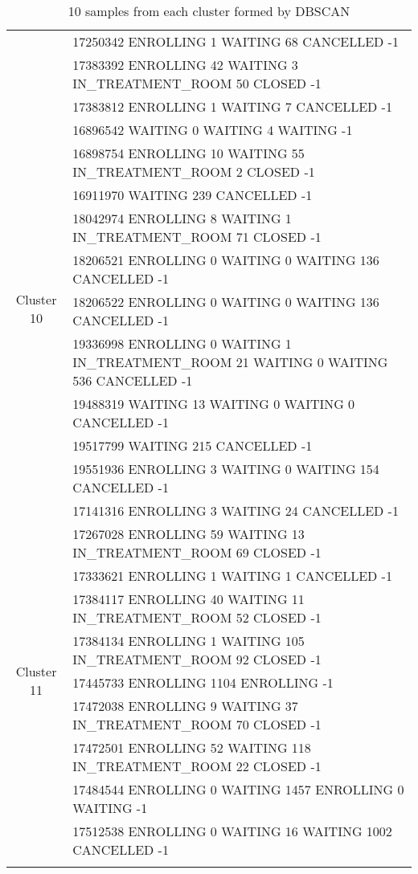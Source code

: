 {\begin{longtable}{|c|p{}|}
		& 17250342 ENROLLING 1 WAITING 68 CANCELLED -1 \\
		& 17383392 ENROLLING 42 WAITING 3 IN\_TREATMENT\_ROOM 50 CLOSED -1 \\
		& 17383812 ENROLLING 1 WAITING 7 CANCELLED -1 \\
		\hline
		\multirow{10}{*}{Cluster 10}
		& 16896542 WAITING 0 WAITING 4 WAITING -1 \\
		& 16898754 ENROLLING 10 WAITING 55 IN\_TREATMENT\_ROOM 2 CLOSED -1 \\
		& 16911970 WAITING 239 CANCELLED -1 \\
		& 18042974 ENROLLING 8 WAITING 1 IN\_TREATMENT\_ROOM 71 CLOSED -1 \\
		& 18206521 ENROLLING 0 WAITING 0 WAITING 136 CANCELLED -1 \\
		& 18206522 ENROLLING 0 WAITING 0 WAITING 136 CANCELLED -1 \\
		& 19336998 ENROLLING 0 WAITING 1 IN\_TREATMENT\_ROOM 21 WAITING 0 WAITING 536 CANCELLED -1 \\
		& 19488319 WAITING 13 WAITING 0 WAITING 0 CANCELLED -1 \\
		& 19517799 WAITING 215 CANCELLED -1 \\
		& 19551936 ENROLLING 3 WAITING 0 WAITING 154 CANCELLED -1 \\
		\hline
		\multirow{10}{*}{Cluster 11}
		& 17141316 ENROLLING 3 WAITING 24 CANCELLED -1 \\
		& 17267028 ENROLLING 59 WAITING 13 IN\_TREATMENT\_ROOM 69 CLOSED -1 \\
		& 17333621 ENROLLING 1 WAITING 1 CANCELLED -1 \\
		& 17384117 ENROLLING 40 WAITING 11 IN\_TREATMENT\_ROOM 52 CLOSED -1 \\
		& 17384134 ENROLLING 1 WAITING 105 IN\_TREATMENT\_ROOM 92 CLOSED -1 \\
		& 17445733 ENROLLING 1104 ENROLLING -1 \\
		& 17472038 ENROLLING 9 WAITING 37 IN\_TREATMENT\_ROOM 70 CLOSED -1 \\
		& 17472501 ENROLLING 52 WAITING 118 IN\_TREATMENT\_ROOM 22 CLOSED -1 \\
		& 17484544 ENROLLING 0 WAITING 1457 ENROLLING 0 WAITING -1 \\
		& 17512538 ENROLLING 0 WAITING 16 WAITING 1002 CANCELLED -1 \\
		\hline
\caption{10 samples from each cluster formed by DBSCAN}
\label{tab:samplesFromCluster}
\end{longtable}
}

